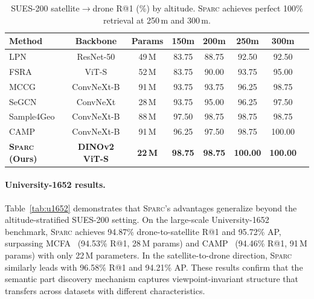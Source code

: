 \documentclass[sigconf, anonymous, review]{acmart}
\newcommand{\ours}{\textsc{Sparc}}
\begin{document}
\begin{table}[t]
\caption{SUES-200 satellite$\to$drone R@1 (\%) by altitude. \ours{} achieves perfect 100\% retrieval at 250\,m and 300\,m.}
\label{tab:sues200_s2d}
\centering
\small
\setlength{\tabcolsep}{4pt}
\begin{tabular}{@{}lccccccc@{}}
\toprule
\textbf{Method} & \textbf{Backbone} & \textbf{Params} & \textbf{150m} & \textbf{200m} & \textbf{250m} & \textbf{300m} \\
\midrule
LPN & ResNet-50 & 49\,M & 83.75 & 88.75 & 92.50 & 92.50 \\
FSRA & ViT-S & 52\,M & 83.75 & 90.00 & 93.75 & 95.00 \\
MCCG & ConvNeXt-B & 91\,M & 93.75 & 93.75 & 96.25 & 98.75 \\
SeGCN & ConvNeXt & 28\,M & 93.75 & 95.00 & 96.25 & 97.50 \\
Sample4Geo & ConvNeXt-B & 88\,M & 97.50 & 98.75 & 98.75 & 98.75 \\
CAMP & ConvNeXt-B & 91\,M & 96.25 & 97.50 & 98.75 & 100.00 \\
\midrule
\rowcolor{bestrow}
\textbf{\ours{} (Ours)} & \textbf{DINOv2 ViT-S} & \textbf{22\,M} & \textbf{98.75} & \textbf{98.75} & \textbf{100.00} & \textbf{100.00} \\
\bottomrule
\end{tabular}
\end{table}

\paragraph{University-1652 results.}
Table~\ref{tab:u1652} demonstrates that \ours{}'s advantages generalize beyond the altitude-stratified SUES-200 setting.
On the large-scale University-1652 benchmark, \ours{} achieves 94.87\% drone-to-satellite R@1 and 95.72\% AP, surpassing MCFA~\cite{wang2025mcfa} (94.53\% R@1, 28\,M params) and CAMP~\cite{yang2024camp} (94.46\% R@1, 91\,M params) with only 22\,M parameters.
In the satellite-to-drone direction, \ours{} similarly leads with 96.58\% R@1 and 94.21\% AP.
These results confirm that the semantic part discovery mechanism captures viewpoint-invariant structure that transfers across datasets with different characteristics.
\end{document}
